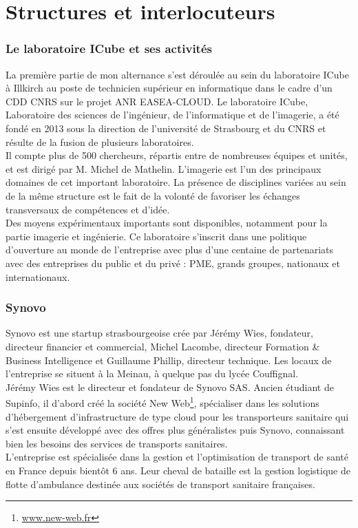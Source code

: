 \documentclass[french, 11pt]{memoir}
\begin{document}
\newpage
\section{Structures et
interlocuteurs}\label{structures-et-interlocuteurs}

\subsubsection{Le laboratoire ICube et ses
activités}\label{le-laboratoire-icube-et-ses-activituxe9s}

La première partie de mon alternance s'est déroulée au sein du
laboratoire ICube à Illkirch au poste de technicien supérieur en
informatique dans le cadre d'un CDD CNRS sur le projet ANR
EASEA-CLOUD. Le laboratoire ICube, Laboratoire des sciences de
l'ingénieur, de l'informatique et de l'imagerie, a été fondé en 2013
sous la direction de l'université de Strasbourg et du CNRS et résulte de
la fusion de plusieurs laboratoires. \\
Il compte plus de 500 chercheurs,
répartis entre de nombreuses équipes et unités, et est dirigé par M.
Michel de Mathelin. L'imagerie est l'un des principaux domaines de cet
important laboratoire. La présence de disciplines variées au sein de la
même structure est le fait de la volonté de favoriser les échanges
transversaux de compétences et d'idée.\\
Des moyens expérimentaux
importants sont disponibles, notamment pour la partie imagerie et
ingénierie. Ce laboratoire s'inscrit dans une politique d'ouverture au
monde de l'entreprise avec plus d'une centaine de partenariats avec des
entreprises du public et du privé : PME, grands groupes, nationaux et
internationaux.

\subsubsection{Synovo}\label{synovo}

Synovo est une startup strasbourgeoise crée par Jérémy Wies, fondateur,
directeur financier et commercial, Michel Lacombe, directeur Formation
\& Business Intelligence et Guillaume Phillip, directeur technique. Les
locaux de l'entreprise se situent à la Meinau, à quelque pas du lycée
Couffignal. \\ 
Jérémy Wies est le directeur et fondateur de Synovo SAS. Ancien étudiant
de Supinfo, il d'abord créé la société New Web\footnote{\url{www.new-web.fr}}, spécialiser dans les
solutions d'hébergement d'infrastructure de type cloud pour les
transporteurs sanitaire qui s'est ensuite développé avec des offres plus
généralistes puis Synovo, connaissant bien les besoins des services de
transports sanitaires. \\
L'entreprise est spécialisée dans la gestion et l'optimisation de
transport de santé en France depuis bientôt 6 ans. Leur cheval de
bataille est la gestion logistique de flotte d'ambulance destinée aux
sociétés de transport sanitaire françaises.
\end{document}
